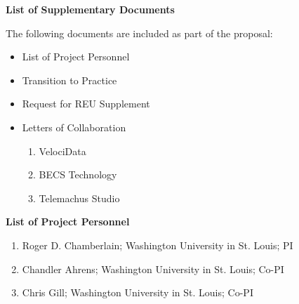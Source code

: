 \documentclass[11pt]{article}
\begin{document}
\pagestyle{empty}
\thispagestyle{empty}

\begin{center}
\textbf{\Large List of Supplementary Documents}
\end{center}

The following documents are included as part of the proposal:

\begin{itemize}

\item List of Project Personnel

\item Transition to Practice

\item Request for REU Supplement

\item Letters of Collaboration

\begin{enumerate}

\item VelociData

\item BECS Technology

\item Telemachus Studio

\end{enumerate}

\end{itemize}

\newpage

\begin{center}
\textbf{\Large List of Project Personnel}
\end{center}

\begin{enumerate}

\item Roger D. Chamberlain; Washington University in St. Louis; PI

\item Chandler Ahrens; Washington University in St. Louis; Co-PI

\item Chris Gill; Washington University in St. Louis; Co-PI

\end{enumerate}
\end{document}
